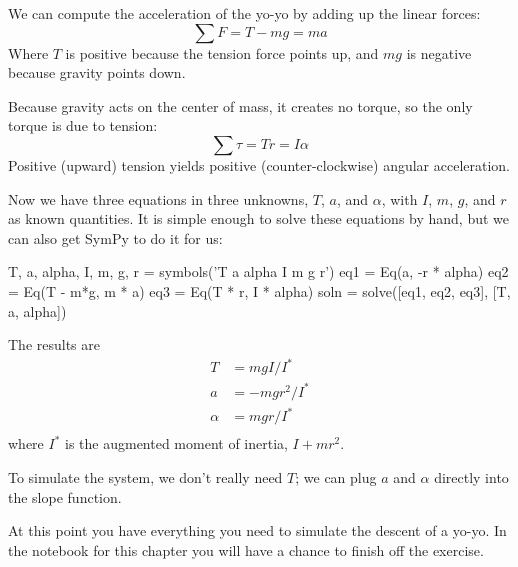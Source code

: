\documentclass[12pt]{book}
\theoremstyle{exercise}
\begin{document}
We can compute the acceleration of the yo-yo by adding up the linear forces:
%
\[ \sum F = T - mg = ma \]
%
Where $T$ is positive because the tension force points up, and $mg$ is negative because gravity points down.

Because gravity acts on the center of mass, it creates no torque, so the only torque is due to tension:
%
\[ \sum \tau = T r = I \alpha \]
%
Positive (upward) tension yields positive (counter-clockwise) angular acceleration.

Now we have three equations in three unknowns, $T$, $a$, and $\alpha$, with $I$, $m$, $g$, and $r$ as known quantities.  It is simple enough to solve these equations by hand, but we can also get SymPy to do it for us:

\begin{python}
T, a, alpha, I, m, g, r = symbols('T a alpha I m g r')
eq1 = Eq(a, -r * alpha)
eq2 = Eq(T - m*g, m * a)
eq3 = Eq(T * r, I * alpha)
soln = solve([eq1, eq2, eq3], [T, a, alpha])
\end{python}

The results are
%
\begin{align*}
T      &= m g I / I^*   \\
a      &= -m g r^2 / I^* \\
\alpha &= m g r / I^*    \\
\end{align*}
%
where $I^*$ is the augmented moment of inertia, $I + m r^2$.

To simulate the system, we don't really need $T$; we can plug $a$ and $\alpha$ directly into the slope function.

At this point you have everything you need to simulate the descent of a yo-yo.  In the notebook for this chapter you will have a chance to finish off the exercise.


\backmatter
\printindex
\end{document}
